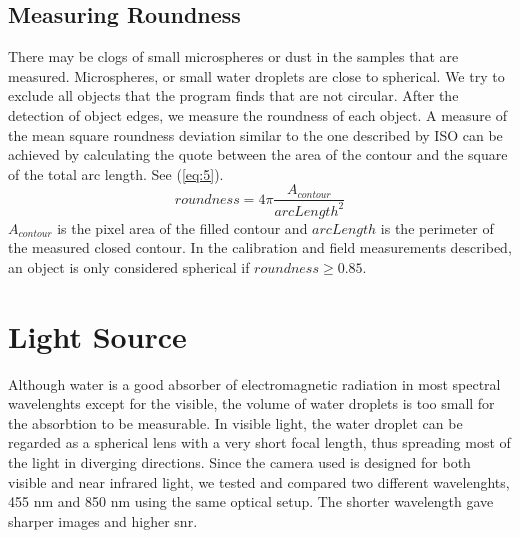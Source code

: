 \subsection{Measuring Roundness}
\label{met:roundness}
There may be clogs of small microspheres or dust in the samples that are measured. Microspheres, or small water droplets are close to spherical. We try to exclude all objects that the program finds that are not circular. After the detection of object edges, we measure the roundness of each object. A measure of the mean square roundness deviation similar to the one described by ISO \cite{iso12181} can be achieved by calculating the quote between the area of the contour and the square of the total arc length. See (\ref{eq:5}).
\begin{equation}
roundness = 4\pi \frac{A_{contour}}{arcLength^2}
\label{eq:5}
\end{equation}
$A_{contour}$ is the pixel area of the filled contour and $arcLength$ is the perimeter of the measured closed contour. In the calibration and field measurements described, an object is only considered spherical if $roundness \geq 0.85$.

\section{Light Source}

Although water is a good absorber of electromagnetic radiation in most spectral wavelenghts except for the visible, the volume of water droplets is too small for the absorbtion to be measurable. In visible light, the water droplet can be regarded as a spherical lens with a very short focal length, thus spreading most of the light in diverging directions. Since the camera used is designed for both visible and near infrared light, we tested and compared two different wavelenghts, 455 nm and 850 nm using the same optical setup. The shorter wavelength gave sharper images and higher \gls{snr}.


